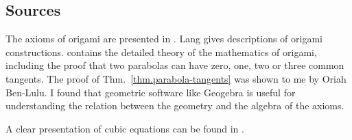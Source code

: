 \subsection*{Sources}

The axioms of origami are presented in \cite{wiki:hh-axioms}. Lang \cite{lang} gives descriptions of origami constructions. 
\cite[Chap.~10]{martin} contains the detailed theory of the mathematics of origami, including the proof that two parabolas can have zero, one, two or three common tangents. The proof of Thm.~\ref{thm.parabola-tangents} was shown to me by Oriah Ben-Lulu. I found that geometric software like Geogebra is useful for understanding the relation between the geometry and the algebra of the axioms.

A clear presentation of cubic equations can be found in \cite[Chapters~1,\ 2]{jorg}.
